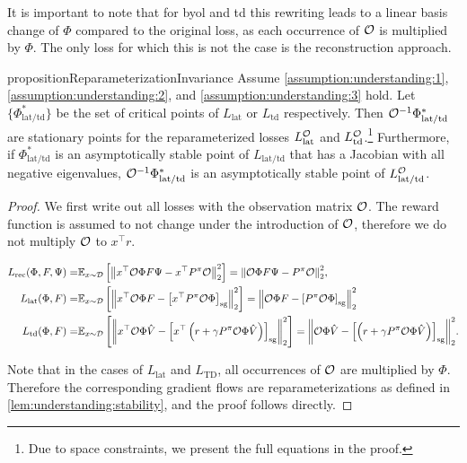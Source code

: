 It is important to note that for \ac{byol} and \ac{td} this rewriting leads to a linear basis change of $\Phi$ compared to the original loss, as each occurrence of ${\mathcal{O}}$ is multiplied by $\Phi$. The only loss for which this is not the case is the reconstruction approach.

\begin{restatable}{proposition}{ReparameterizationInvariance} 
Assume \autoref{assumption:understanding:1}, \autoref{assumption:understanding:2}, and \autoref{assumption:understanding:3} hold. Let $\{\Phi^*_\mathrm{lat/td}\}$ be the set of critical points of $L_\mathrm{lat}$ or $L_\mathrm{td}$ respectively.
Then ${\mathcal{O}}^{-1}\Phi^*_\mathrm{lat/td}$ are stationary points for the reparameterized losses $L_\mathrm{lat}^{\mathcal{O}}$ and $L_\mathrm{td}^{\mathcal{O}}$.\footnote{Due to space constraints, we present the full equations in the proof.} Furthermore, if $\Phi^*_\mathrm{lat/td}$ is an asymptotically stable point of $L_\mathrm{lat/td}$ that has a Jacobian with all negative eigenvalues, ${\mathcal{O}}^{-1}\Phi^*_\mathrm{lat/td}$ is an asymptotically stable point of $L_\mathrm{lat/td}^{\mathcal{O}}$.
\end{restatable}
\begin{proof}
We first write out all losses with the observation matrix ${\mathcal{O}}$. The reward function is assumed to not change under the introduction of ${\mathcal{O}}$, therefore we do not multiply ${\mathcal{O}}$ to $x^\top r$.

\begin{align*}
    L_{\text{rec}}(\Phi,F,\Psi) =& \mathbb{E}_{x \sim \mathcal{D}}\left[  \left\lVert x^\top {\mathcal{O}} \Phi F \Psi - x^\top {P^\pi}{\mathcal{O}} \right\rVert_2^2 \right] = {\left\lVert {\mathcal{O}} \Phi F \Psi - {P^\pi}{\mathcal{O}} \right\rVert_2^2}, \\
    L_{\text{lat}}(\Phi,F) =& \mathbb{E}_{x \sim \mathcal{D}}\left[  \left\lVert x^\top {\mathcal{O}} \Phi F - \left[x^\top {P^\pi} {\mathcal{O}} \Phi\right]_{\mathrm{sg}} \right\rVert_2^2 \right] = \left\lVert {\mathcal{O}} \Phi F - \left[{P^\pi} {\mathcal{O}} \Phi\right]_{\mathrm{sg}} \right\rVert_2^2 \\
    L_{\text{td}}(\Phi,F) =& \mathbb{E}_{x \sim \mathcal{D}}\left[  \left\lVert x^\top{\mathcal{O}}\Phi \hat{V} - \left[x^\top \left(r + \gamma P^\pi {\mathcal{O}}\Phi \hat{V}\right)\right]_{\mathrm{sg}} \right\rVert_2^2 \right] = {\left\lVert {\mathcal{O}}\Phi \hat{V} - \left[\left(r + \gamma P^\pi {\mathcal{O}}\Phi \hat{V}\right)\right]_{\mathrm{sg}} \right\rVert_2^2}.
\end{align*}

Note that in the cases of $L_{\text{lat}}$ and $L_\text{TD}$, all occurrences of ${\mathcal{O}}$ are multiplied by $\Phi$.
Therefore the corresponding gradient flows are reparameterizations as defined in \autoref{lem:understanding:stability}, and the proof follows directly.
\end{proof}

